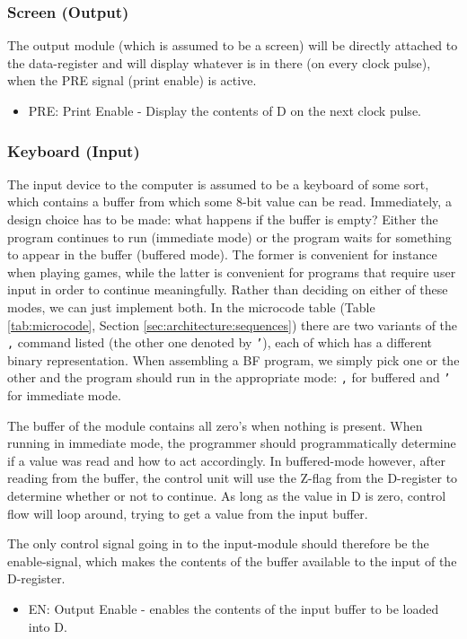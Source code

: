 \subsubsection{Screen (Output)}
The output module (which is assumed to be a screen) will be directly attached to the data-register and will display whatever is in there (on every clock pulse), when the PRE signal (print enable) is active.
\begin{itemize}
\item PRE: Print Enable - Display the contents of D on the next clock pulse.
\end{itemize}


\subsubsection{Keyboard (Input)} \label{sec:architecture:input}
The input device to the computer is assumed to be a keyboard of some sort, which contains a buffer from which some 8-bit value can be read. Immediately, a design choice has to be made: what happens if the buffer is empty? Either the program continues to run (immediate mode) or the program waits for something to appear in the buffer (buffered mode). The former is convenient for instance when playing games, while the latter is convenient for programs that require user input in order to continue meaningfully. Rather than deciding on either of these modes, we can just implement both. In the microcode table (Table \ref{tab:microcode}, Section \ref{sec:architecture:sequences}) there are two variants of the \texttt{,} command listed (the other one denoted by \texttt{'}), each of which has a different binary representation. When assembling a BF program, we simply pick one or the other and the program should run in the appropriate mode: \texttt{,} for buffered and \texttt{'} for immediate mode.

The buffer of the module contains all zero's when nothing is present. When running in immediate mode, the programmer should programmatically determine if a value was read and how to act accordingly. In buffered-mode however, after reading from the buffer, the control unit will use the Z-flag from the D-register to determine whether or not to continue. As long as the value in D is zero, control flow will loop around, trying to get a value from the input buffer.

The only control signal going in to the input-module should therefore be the enable-signal, which makes the contents of the buffer available to the input of the D-register.
\begin{itemize}
\item EN: Output Enable - enables the contents of the input buffer to be loaded into D.
\end{itemize}

